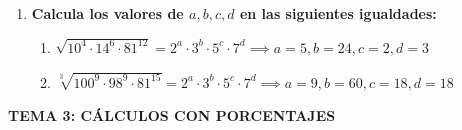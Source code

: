 \documentclass[a4paper,12pt]{article}
\begin{document}
\begin{enumerate}
    \item \textbf{Calcula los valores de $a, b, c, d$ en las siguientes igualdades:}
        \begin{enumerate}[label=\alph*)]
            \item $\sqrt{10^{4} \cdot 14^{6} \cdot 81^{12}} = 2^{a} \cdot 3^{b} \cdot 5^{c} \cdot 7^{d} \implies a=5, b=24, c=2, d=3$
            \item $\sqrt[3]{100^{9} \cdot 98^{9} \cdot 81^{15}} = 2^{a} \cdot 3^{b} \cdot 5^{c} \cdot 7^{d} \implies a=9, b=60, c=18, d=18$
        \end{enumerate}

\end{enumerate}

\begin{center}
    \textbf{\color{primary} TEMA 3: CÁLCULOS CON PORCENTAJES}
\end{center}
\end{document}
